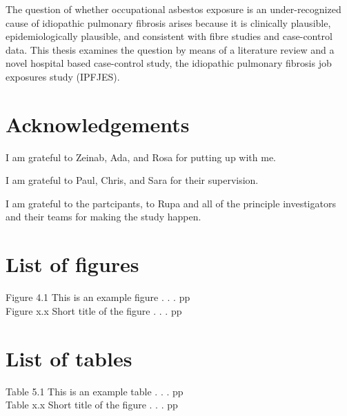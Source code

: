 \documentclass[12pt,a4paper,]{report}
\begin{document}
The question of whether occupational asbestos exposure is an
under-recognized cause of idiopathic pulmonary fibrosis arises because
it is clinically plausible, epidemiologically plausible, and consistent
with fibre studies and case-control data. This thesis examines the
question by means of a literature review and a novel hospital based
case-control study, the idiopathic pulmonary fibrosis job exposures
study (IPFJES).

\setcounter{page}{1}

\hypertarget{acknowledgements}{%
\chapter*{Acknowledgements}\label{acknowledgements}}

I am grateful to Zeinab, Ada, and Rosa for putting up with me.

I am grateful to Paul, Chris, and Sara for their supervision.

I am grateful to the partcipants, to Rupa and all of the principle
investigators and their teams for making the study happen.

\newpage


\tableofcontents

\newpage

\hypertarget{list-of-figures}{%
\chapter*{List of figures}\label{list-of-figures}}

Figure 4.1 This is an example figure . . . \hfill{pp}\\
Figure x.x Short title of the figure . . . \hfill{pp}

\setcounter{page}{3}

\newpage

\hypertarget{list-of-tables}{%
\chapter*{List of tables}\label{list-of-tables}}

Table 5.1 This is an example table . . . \hfill{pp}\\
Table x.x Short title of the figure . . . \hfill{pp}
\end{document}
